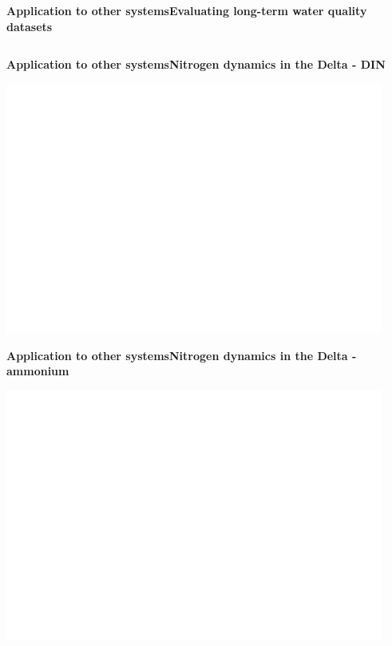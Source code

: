 \documentclass[serif]{beamer}\usepackage[]{graphicx}\usepackage[]{color}
\begin{document}
\begin{frame}{\textbf{Application to other systems}}{\textbf{Evaluating long-term water quality datasets}}
\begin{columns}
\begin{column}{0.65\textwidth}
\end{column}
\end{columns}
\end{frame}

\begin{frame}{\textbf{Application to other systems}}{\textbf{Nitrogen dynamics in the Delta - DIN}} 
\centerline{\includegraphics[width = 0.93\textwidth, page = 2]{fig/trndsperdin.pdf}}
\end{frame}

\begin{frame}{\textbf{Application to other systems}}{\textbf{Nitrogen dynamics in the Delta - ammonium}} 
\centerline{\includegraphics[width = 0.93\textwidth, page = 2]{fig/trndspernh.pdf}}
\end{frame}
\end{document}

